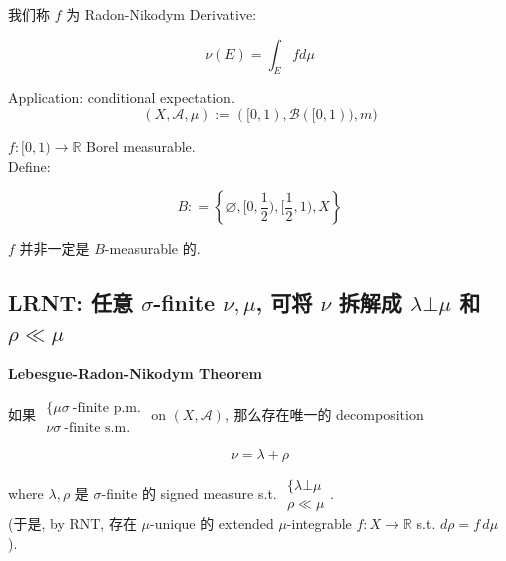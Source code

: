 \documentclass{qlnotes-export}
\begin{document}
我们称 \(f\) 为 Radon-Nikodym Derivative:

\[\nu(E) = \int_{E}f d\mu\]

\begin{example}

Application: conditional expectation.\\

\[(X,\mathcal{A},\mu) := (\lbrack 0,1),\mathcal{B}(\lbrack 0,1)),m)\]

\(f:\lbrack 0,1)\rightarrow{\mathbb{R}}\) Borel measurable.\\
Define:

\[B: = \left\{ {\varnothing,\lbrack 0,\frac{1}{2}),\lbrack\frac{1}{2},1),X} \right\}\]

\(f\) 并非一定是 \(B\)-measurable 的.

\end{example}

\subsection{\texorpdfstring{LRNT: 任意 \(\sigma\)-finite \(\nu,\mu\), 可将 \(\nu\) 拆解成 \(\lambda\bot\mu\) 和 \(\rho \ll \mu\)}{LRNT: 任意 \textbackslash sigma-finite \textbackslash nu,\textbackslash mu, 可将 \textbackslash nu 拆解成 \textbackslash lambda\textbackslash bot\textbackslash mu 和 \textbackslash rho \textbackslash ll \textbackslash mu}}\label{lrnt-ux4efbux610f-sigma-finite-numu-ux53efux5c06-nu-ux62c6ux89e3ux6210-lambdabotmu-ux548c-rho-ll-mu}

\begin{theorem}{\protect{}\label{kn-lebesgue-radon-nikodym-theorem}{\textbf{Lebesgue-Radon-Nikodym
Theorem}}}

如果 \(\begin{matrix}
{\{\mu\sigma\ \text{-finite p.m.}} \\
{\nu\sigma\ \text{-finite s.m.}}
\end{matrix}\) on \((X,\mathcal{A})\), 那么存在唯一的 decomposition

\[\nu = \lambda + \rho\]

where \(\lambda,\rho\) 是 \(\sigma\)-finite 的 signed measure s.t. \(\begin{matrix}
{\{\lambda\bot\mu} \\
{\rho \ll \mu}
\end{matrix}\).\\
(于是, by RNT, 存在 \(\mu\)-unique 的 extended \(\mu\)-integrable \(f:X\rightarrow{\mathbb{R}}\) s.t. \(d\rho = f\, d\mu\) ).

\end{theorem}
\end{document}
